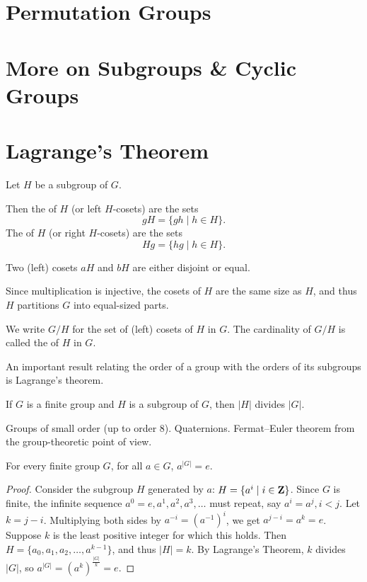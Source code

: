 \section{Permutation Groups}

\section{More on Subgroups \& Cyclic Groups}


\section{Lagrange's Theorem}
\begin{definition}[Coset]
Let $H$ be a subgroup of $G$.

Then the  of $H$ (or left $H$-cosets) are the sets
\[ gH=\{gh\mid h\in H\}. \]
The  of $H$ (or right $H$-cosets) are the sets
\[ Hg=\{hg\mid h\in H\}. \]
\end{definition}

Two (left) cosets $aH$ and $bH$ are either disjoint or equal. 

Since multiplication is injective, the cosets of $H$ are the same size as $H$, and thus $H$ partitions $G$ into equal-sized parts.

\begin{notation}
We write $G/H$ for the set of (left) cosets of $H$ in $G$. The cardinality of $G/H$ is called the  of $H$ in $G$.
\end{notation}

An important result relating the order of a group with the orders of its subgroups is Lagrange's theorem.

\begin{theorem}
If $G$ is a finite group and $H$ is a subgroup of $G$, then $|H|$ divides $|G|$.
\end{theorem}

Groups of small order (up to order 8). Quaternions. Fermat--Euler theorem
from the group-theoretic point of view.

\begin{theorem}
For every finite group $G$, for all $a \in G$, $a^{|G|}=e$.
\end{theorem}

\begin{proof}
Consider the subgroup $H$ generated by $a$: $H = \{a^i \mid i \in \mathbf Z\}$. Since $G$ is finite, the infinite sequence $a^0=e, a^1, a^2, a^3, \dots$ must repeat, say $a^i = a^j, i < j$. Let $k=j-i$. Multiplying both sides by $a^{-i} = (a^{-1})^i$, we get $a^{j-i} = a^k = e$. Suppose $k$ is the least positive integer for which this holds. Then $H = \{a_0, a_1, a_2, \dots, a^{k-1}\}$, and thus $|H| = k$. By Lagrange’s Theorem, $k$ divides $|G|$, so $a^{|G|} = (a^k)^\frac{|G|}{k} = e$.
\end{proof}
